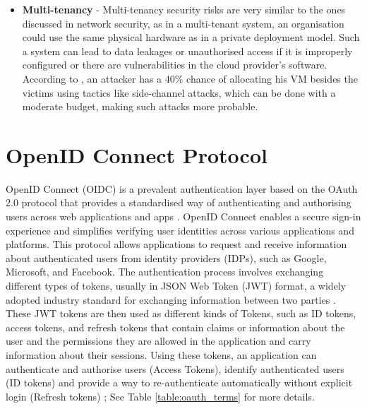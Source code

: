 \begin{itemize}
    \item \textbf{Multi-tenancy} - Multi-tenancy security risks are very similar to the ones discussed in network security, as in a multi-tenant system, an organisation could use the same physical hardware as in a private deployment model. Such a system can lead to data leakages or unauthorised access if it is improperly configured or there are vulnerabilities in the cloud provider's software.   According to \citep{multi_tenancy_cloud_risk}, an attacker has a 40\% chance of allocating his VM besides the victims using tactics like side-channel attacks, which can be done with a moderate budget, making such attacks more probable.

\end{itemize}

\section{OpenID Connect Protocol}
OpenID Connect (OIDC) is a prevalent authentication layer based on the OAuth 2.0 protocol that provides a standardised way of authenticating and authorising users across web applications and apps \citep{oidc_intro}. OpenID Connect enables a secure sign-in experience and simplifies verifying user identities across various applications and platforms. This protocol allows applications to request and receive information about authenticated users from identity providers (IDPs), such as Google, Microsoft, and Facebook. The authentication process involves exchanging different types of tokens, usually in JSON Web Token (JWT) format, a widely adopted industry standard for exchanging information between two parties \citep{jwt}. These JWT tokens are then used as different kinds of Tokens, such as ID tokens, access tokens, and refresh tokens that contain claims or information about the user and the permissions they are allowed in the application and carry information about their sessions. Using these tokens, an application can authenticate and authorise users (Access Tokens), identify authenticated users (ID tokens) and provide a way to re-authenticate automatically without explicit login (Refresh tokens) \citep{oidc_tokens}; See Table \ref{table:oauth_terms} for more details. 

